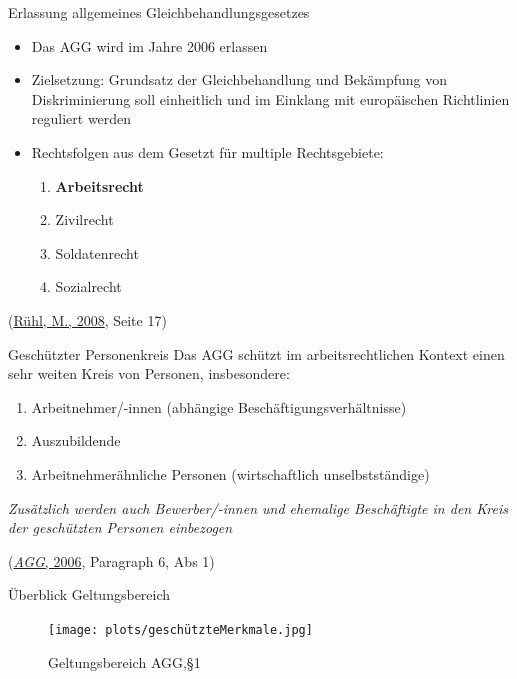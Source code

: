 \documentclass[
  10pt,
  ignorenonframetext,
]{beamer}
\providecommand{\tightlist}{%
  \setlength{\itemsep}{0pt}\setlength{\parskip}{0pt}}
\begin{document}
\begin{frame}{Erlassung allgemeines Gleichbehandlungsgesetzes}
\protect\hypertarget{erlassung-allgemeines-gleichbehandlungsgesetzes}{}
\begin{itemize}
\item
  Das AGG wird im Jahre 2006 erlassen
\item
  Zielsetzung: Grundsatz der Gleichbehandlung und Bekämpfung von
  Diskriminierung soll einheitlich und im Einklang mit europäischen
  Richtlinien reguliert werden
\item
  Rechtsfolgen aus dem Gesetzt für multiple Rechtsgebiete:

  \begin{enumerate}
  \tightlist
  \item
    \textbf{Arbeitsrecht}
  \item
    Zivilrecht
  \item
    Soldatenrecht
  \item
    Sozialrecht
  \end{enumerate}
\end{itemize}

(\protect\hyperlink{ref-main}{Rühl, M., 2008}, Seite 17)
\end{frame}

\begin{frame}{Geschützter Personenkreis}
\protect\hypertarget{geschuxfctzter-personenkreis}{}
Das AGG schützt im arbeitsrechtlichen Kontext einen sehr weiten Kreis
von Personen, insbesondere:

\begin{enumerate}
\tightlist
\item
  Arbeitnehmer/-innen (abhängige Beschäftigungsverhältnisse)
\item
  Auszubildende
\item
  Arbeitnehmerähnliche Personen (wirtschaftlich unselbstständige)
\end{enumerate}

\emph{Zusätzlich werden auch Bewerber/-innen und ehemalige Beschäftigte
in den Kreis der geschützten Personen einbezogen}

(\protect\hyperlink{ref-agg}{\emph{AGG}, 2006}, Paragraph 6, Abs 1)
\end{frame}

\begin{frame}{Überblick Geltungsbereich}
\protect\hypertarget{uxfcberblick-geltungsbereich}{}
\begin{figure}
\centering
\texttt{[image: plots/geschützteMerkmale.jpg]}
\caption{Geltungsbereich AGG,§1}
\end{figure}
\end{frame}
\end{document}
